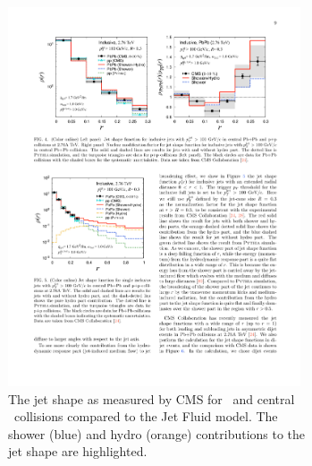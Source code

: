 \begin{figure}
\begin{subfigure}{.45\textwidth}
  \centering
\includegraphics[width=0.95\textwidth]{figures/jetMeasurements/JF_jetShape}
\caption{The jet shape as measured by CMS for \pp\ and central \pbpb\ collisions \cite{Chatrchyan:2013kwa} compared to the Jet Fluid model. The shower (blue) and hydro (orange) contributions to the jet shape are highlighted.}
\label{fig:jf_jetshape}
\end{subfigure} \qquad
\begin{subfigure}{.45\textwidth}
  \centering

\end{subfigure}
\end{figure}
